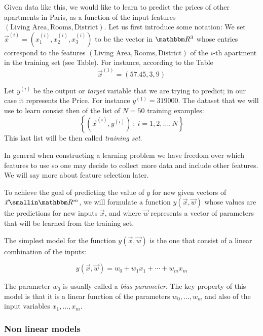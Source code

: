 Given data like this, we would like to learn to predict the prices of other apartments in Paris, as a function of the input features $(\text{Living Area},\text{Rooms},\text{District})$. Let us first introduce some notation: We set $\vec{x}^{(i)} = (x_1^{(i)},x_2^{(i)},x_3^{(i)})$ to be the vector in $\RR^3$ whose entries correspond to the features $(\text{Living Area},\text{Rooms},\text{District})$ of the $i$-th apartment in the training set (see Table). For instance, according to the Table 
\[\vec{x}^{(1)}= (57.45, 3, 9)\]

Let $y^{(i)}$ be the output or \emph{target} variable that we are trying to predict; in our case it represents the Price. For instance $y^{(1)} = 319000$. The dataset that we will use to learn consist then of the list of $N=50$ training examples: 
\[\left\{ \left( \vec{x}^{(i)}, y^{(i)} \right) \ : \ i=1,2,...,N \right\}\]
This last list will be then called \emph{training set}. 

\begin{remark}
	In general when constructing a learning problem we have freedom over which features to use so one may decide to collect more data and include other features. We will say more about feature selection later. 
\end{remark}

To achieve the goal of predicting the value of $y$ for new given vectors of $\vec{x} \in \RR^m$, we will formulate a function $y(\vec{x},\vec{w})$ whose values are the predictions for new inputs $\vec{x}$, and where $\vec{w}$ represents a vector of parameters that will be learned from the training set. 

The simplest model for the function $y(\vec{x},\vec{w})$ is the one that consist of a linear combination of the inputs: 

\begin{equation}\label{Eq.Sec.Lin.Reg.1}
	y(\vec{x},\vec{w}) = w_0 + w_1x_1 + \cdots + w_m x_m
\end{equation}

\begin{remark}
	The parameter $w_0$ is usually called a \emph{bias parameter}. The key property of this model is that it is a linear function of the parameters $w_0,...,w_m$ and also of the input variables $x_1,...,x_m$. 
\end{remark}


\subsubsection{Non linear models}


